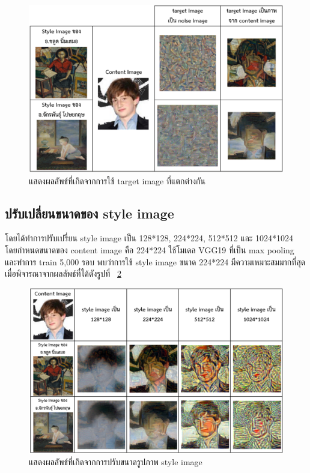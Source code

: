 \documentclass[12pt,oneside,openright,a4paper]{cpe-thai-project}
\begin{document}
\begin{figure}[!h]
  \centering
  \includegraphics[width=12cm]{./image/model2.png}
  \caption{แสดงผลลัพธ์ที่เกิดจากการใช้ target image ที่แตกต่างกัน}
  \label{fig:model2}
\end{figure}

\newpage

\subsection{ปรับเปลี่ยนขนาดของ style image}
โดยได้ทำการปรับเปรี่ยน style image เป็น 128*128, 224*224, 512*512 และ 1024*1024 โดยกำหนดขนาดของ content image คือ 224*224 ใช้โมเดล VGG19 ที่เป็น max pooling และทำการ train 5,000 รอบ พบว่าการใช้ style image ขนาด 224*224 มีความเหมาะสมมากที่สุดเมื่อพิจารณาจากผลลัพธ์ที่ได้ดังรูปที่ ~\ref{fig:model3}

\begin{figure}[!h]
  \centering
  \includegraphics[width=12cm]{./image/model3.png}
  \caption{แสดงผลลัพธ์ที่เกิดจากการปรับขนาดรูปภาพ style image}
  \label{fig:model3}
\end{figure}
\end{document}
